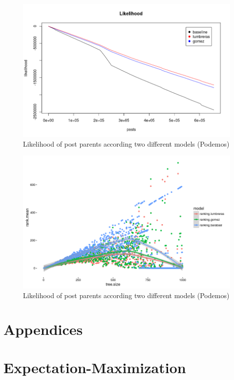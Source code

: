 \documentclass[smallextended]{svjour3}          %
\begin{document}
\begin{figure}
\center
\includegraphics[width=1\textwidth]{predictions_likelihood_podemos}
\caption{Likelihood of post parents according two different models (Podemos)}
\end{figure}

\begin{figure}
\center
\includegraphics[width=1\textwidth]{benchmark_ranking2}
\caption{Likelihood of post parents according two different models (Podemos)}
\end{figure}


\newpage
\appendix
\section*{Appendices}
\section{Expectation-Maximization}
\end{document}
